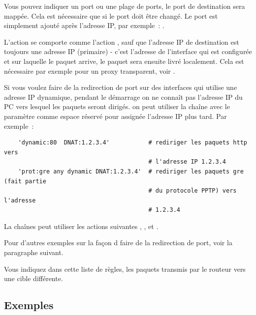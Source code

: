 Vous pouvez indiquer un port ou une plage de ports, le port de destination
sera mappée. Cela est nécessaire que si le port doit être changé. Le port est
simplement ajouté après l'adresse IP, par exemple~: .

L'action  se comporte comme l'action , sauf
que l'adresse IP de destination est toujours une adresse IP (primaire) - c'est
l'adresse de l'interface qui est configurée et sur laquelle le paquet arrive,
le paquet sera ensuite livré localement. Cela est nécessaire par exemple
pour un proxy transparent, voir .

Si vous voulez faire de la redirection de port sur des interfaces qui utilise
une adresse IP dynamique, pendant le démarrage on ne connaît pas l'adresse IP
du PC vers lesquel les paquets seront dirigés. on peut utiliser la chaîne
 avec le paramètre  comme espace réservé
pour assignée l'adresse IP plus tard. Par exemple~:

\begin{example}
{\footnotesize
\begin{verbatim}
    'dynamic:80  DNAT:1.2.3.4'           # rediriger les paquets http vers
                                         # l'adresse IP 1.2.3.4
    'prot:gre any dynamic DNAT:1.2.3.4'  # rediriger les paquets gre (fait partie
                                         # du protocole PPTP) vers l'adresse
                                         # 1.2.3.4 
\end{verbatim}}
\end{example}

La chaînes  peut utiliser les actions suivantes
, ,  et .

Pour d'autres exemples sur la façon d faire de la redirection de port,
voir la paragraphe suivant.

\begin{description}
\mbox{}\newline
Vous indiquez dans cette liste de règles, les paquets transmis par le routeur
vers une cible différente.
\end{description}

\subsection{Exemples}

